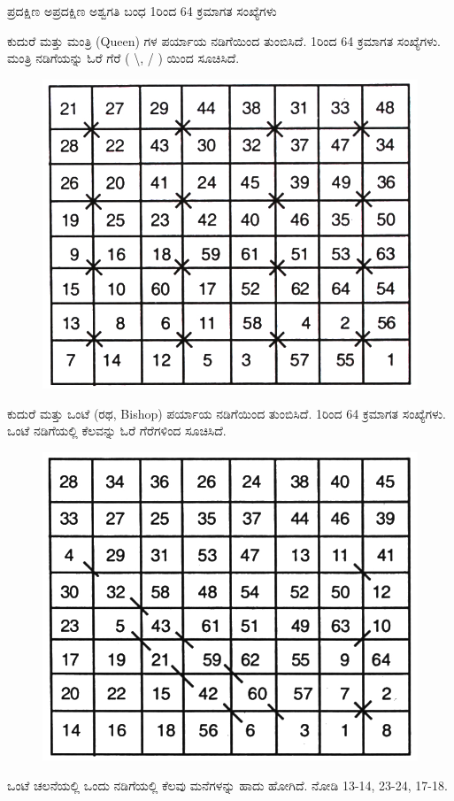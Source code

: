 ಪ್ರದಕ್ಷಿಣ ಅಪ್ರದಕ್ಷಿಣ ಅಶ್ವಗತಿ ಬಂಧ 1ರಿಂದ 64 ಕ್ರಮಾಗತ ಸಂಖ್ಯೆಗಳು

ಕುದುರೆ ಮತ್ತು ಮಂತ್ರಿ (Queen) ಗಳ ಪರ್ಯಾಯ ನಡಿಗೆಯಿಂದ ತುಂಬಿಸಿದೆ. 1ರಿಂದ 64 ಕ್ರಮಾಗತ ಸಂಖ್ಯೆಗಳು. ಮಂತ್ರಿ ನಡಿಗೆಯನ್ನು ಓರೆ ಗೆರೆ ( {\textbackslash ,} / ) ಯಿಂದ ಸೂಚಿಸಿದೆ.
\begin{figure}[H]
\includegraphics{src/figures/chap6/fig6-23.jpg}
\end{figure}

ಕುದುರೆ ಮತ್ತು ಒಂಟೆ (ರಥ, Bishop) ಪರ್ಯಾಯ ನಡಿಗೆಯಿಂದ ತುಂಬಿಸಿದೆ. 1ರಿಂದ 64 ಕ್ರಮಾಗತ ಸಂಖ್ಯೆಗಳು. ಒಂಟೆ ನಡಿಗೆಯಲ್ಲಿ ಕೆಲವನ್ನು ಓರೆ ಗೆರೆಗಳಿಂದ ಸೂಚಿಸಿದೆ.
\begin{figure}[H]
\includegraphics{src/figures/chap6/fig6-24.jpg}
\end{figure}

ಒಂಟೆ ಚಲನೆಯಲ್ಲಿ ಒಂದು ನಡಿಗೆಯಲ್ಲಿ ಕೆಲವು ಮನೆಗಳನ್ನು ಹಾದು ಹೋಗಿದೆ. ನೋಡಿ 13-14, 23-24, 17-18.

